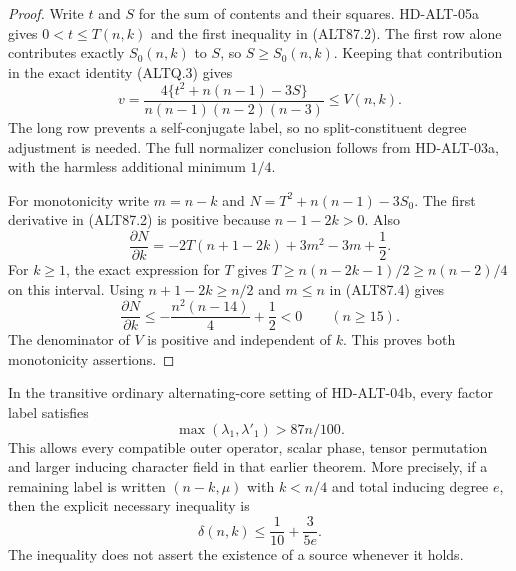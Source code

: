 \begin{proof}
Write $t$ and $S$ for the sum of contents and their squares.
HD-ALT-05a gives $0<t\le T(n,k)$ and the first inequality in
(ALT87.2). The first row alone contributes exactly $S_0(n,k)$
to $S$, so $S\ge S_0(n,k)$. Keeping that contribution in the
exact identity (ALTQ.3) gives
\[
 v=\frac{4\{t^2+n(n-1)-3S\}}{n(n-1)(n-2)(n-3)}\le V(n,k).
\]
The long row prevents a self-conjugate label, so no split-constituent
degree adjustment is needed. The full normalizer conclusion follows
from HD-ALT-03a, with the harmless additional minimum $1/4$.

For monotonicity write $m=n-k$ and $N=T^2+n(n-1)-3S_0$.
The first derivative in (ALT87.2) is positive because
$n-1-2k>0$. Also
\[
 \frac{\partial N}{\partial k}
       =-2T(n+1-2k)+3m^2-3m+\frac12.                      \tag{ALT87.4}
\]
For $k\ge1$, the exact expression for $T$ gives
$T\ge n(n-2k-1)/2\ge n(n-2)/4$ on this interval.
Using $n+1-2k\ge n/2$ and $m\le n$ in (ALT87.4) gives
\[
 \frac{\partial N}{\partial k}
 \le-\frac{n^2(n-14)}4+\frac12<0\qquad(n\ge15).
\]
The denominator of $V$ is positive and independent of $k$.
This proves both monotonicity assertions.
\end{proof}

\begin{theorem}
\label{HD-ALT-06b}
In the transitive ordinary alternating-core setting of HD-ALT-04b,
every factor label satisfies
\[
                       \max(\lambda_1,\lambda'_1)>87n/100.
                                                               \tag{ALT87.5}
\]
This allows every compatible outer operator, scalar phase, tensor
permutation and larger inducing character field in that earlier theorem.
More precisely, if a remaining label is written $(n-k,\mu)$ with
$k<n/4$ and total inducing degree $e$, then the explicit necessary
inequality is
\[
                          \delta(n,k)\le\frac1{10}+\frac3{5e}.
                                                               \tag{ALT87.6}
\]
The inequality does not assert the existence of a source whenever it holds.
\end{theorem}

